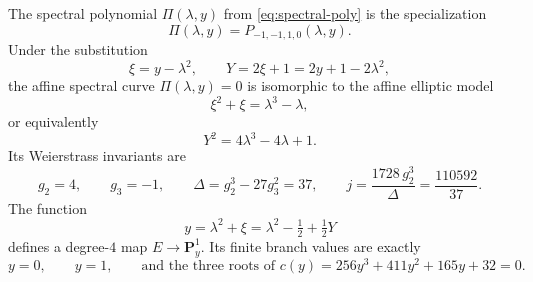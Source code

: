 \begin{theorem}\label{thm:elliptic-reduction}
The spectral polynomial \(\Pi(\lambda,y)\) from \eqref{eq:spectral-poly} is the specialization
\[
\Pi(\lambda,y)=P_{-1,-1,1,0}(\lambda,y).
\]
Under the substitution
\begin{equation}\label{eq:xi-def}
\xi = y - \lambda^2, \qquad Y = 2\xi + 1 = 2y + 1 - 2\lambda^2,
\end{equation}
the affine spectral curve \(\Pi(\lambda,y)=0\) is isomorphic to the affine elliptic model
\begin{equation}\label{eq:elliptic-xi}
\xi^2 + \xi = \lambda^3 - \lambda,
\end{equation}
or equivalently
\begin{equation}\label{eq:elliptic-weierstrass}
Y^2 = 4\lambda^3 - 4\lambda + 1.
\end{equation}
Its Weierstrass invariants are
\begin{equation}\label{eq:weierstrass-invariants}
g_2 = 4, \qquad g_3 = -1, \qquad
\Delta = g_2^3 - 27g_3^2 = 37, \qquad
j = \frac{1728\,g_2^3}{\Delta} = \frac{110592}{37}.
\end{equation}
The function
\begin{equation}\label{eq:y-from-E}
y = \lambda^2 + \xi = \lambda^2 - \tfrac{1}{2} + \tfrac{1}{2}Y
\end{equation}
defines a degree-\(4\) map \(E\to \mathbf P^1_y\).
Its finite branch values are exactly
\begin{equation}\label{eq:branch-values}
y = 0, \qquad y = 1, \qquad
\text{and the three roots of } c(y) = 256y^3 + 411y^2 + 165y + 32 = 0.
\end{equation}
\end{theorem}

